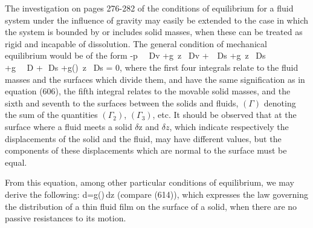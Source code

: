 \documentclass[12pt]{article}
\newcommand{\dd}{\delta}
\begin{document}
The investigation on pages 276-282 of the conditions of equilibrium for a fluid system  under the influence of gravity may easily be extended to the case in which the system is bounded by or includes solid masses, when these can be treated as rigid and incapable of dissolution. The general condition of mechanical equilibrium would be of the form
\eqs-\int p \, \dd \, Dv +\int g\gamma\, \dd z \, Dv +\int \sigma \, \dd \, Ds +\int g\Gamma \, \dd z \, Ds \\
+\int g \, \dd {} \, D +\int \varsigma \,\dd\, Ds +\int g(\Gamma)\, \dd z \, Ds = 0,  \label{680}  \eqe
where the first four integrals relate to the fluid masses and the surfaces which divide them, and have the same signification as in equation (606), the fifth integral relates to the movable solid masses, and the sixth and seventh to the surfaces between the solids and fluids, $(\Gamma)$ denoting the sum of the quantities $(\Gamma_2)$, $(\Gamma_3)$, etc. It should be observed that at the surface where a fluid meets a solid $\dd \text{z}$ and $\dd z$, which indicate respectively the displacements of the solid and the fluid, may have different values, but the components of these displacements which are normal to the surface must be equal.

From this equation, among other particular conditions of equilibrium, we may derive the following:
\eqs d\varepsilon =g(\Gamma)\,dz    \label{681} \eqe
(compare (614)), which expresses the law governing the distribution of a thin fluid film on the surface of a solid, when there are no passive resistances to its motion.
\end{document}
